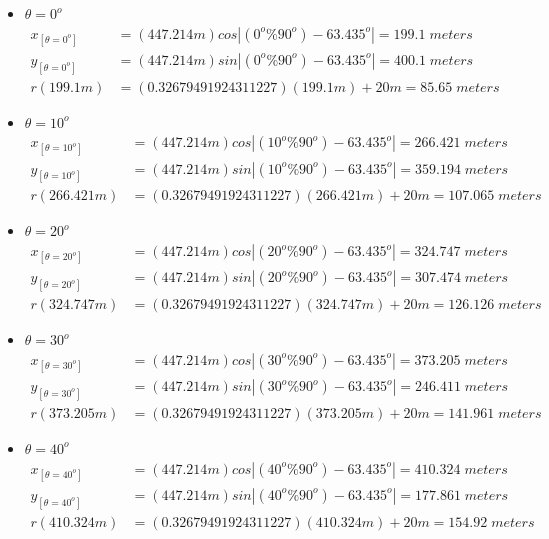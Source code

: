     \begin{itemize}
\item $\theta=0^o$
	\begin{align*}%
		x_{[\theta=0^o]} &=(447.214m) cos\left| (0^o\%90^o) - 63.435^o \right|  =199.1\;meters \\
		y_{[\theta=0^o]} &=(447.214m) sin\left| (0^o\%90^o) - 63.435^o \right|  =400.1\;meters \\
		r(199.1m) &=(0.32679491924311227)(199.1m)+20m  =85.65\;meters\end{align*}
\item $\theta=10^o$
	\begin{align*}%
		x_{[\theta=10^o]} &=(447.214m) cos\left| (10^o\%90^o) - 63.435^o \right|  =266.421\;meters \\
		y_{[\theta=10^o]} &=(447.214m) sin\left| (10^o\%90^o) - 63.435^o \right|  =359.194\;meters \\
		r(266.421m) &=(0.32679491924311227)(266.421m)+20m  =107.065\;meters\end{align*}
\item $\theta=20^o$
	\begin{align*}%
		x_{[\theta=20^o]} &=(447.214m) cos\left| (20^o\%90^o) - 63.435^o \right|  =324.747\;meters \\
		y_{[\theta=20^o]} &=(447.214m) sin\left| (20^o\%90^o) - 63.435^o \right|  =307.474\;meters \\
		r(324.747m) &=(0.32679491924311227)(324.747m)+20m  =126.126\;meters\end{align*}
\item $\theta=30^o$
	\begin{align*}%
		x_{[\theta=30^o]} &=(447.214m) cos\left| (30^o\%90^o) - 63.435^o \right|  =373.205\;meters \\
		y_{[\theta=30^o]} &=(447.214m) sin\left| (30^o\%90^o) - 63.435^o \right|  =246.411\;meters \\
		r(373.205m) &=(0.32679491924311227)(373.205m)+20m  =141.961\;meters\end{align*}
\item $\theta=40^o$
	\begin{align*}%
		x_{[\theta=40^o]} &=(447.214m) cos\left| (40^o\%90^o) - 63.435^o \right|  =410.324\;meters \\
		y_{[\theta=40^o]} &=(447.214m) sin\left| (40^o\%90^o) - 63.435^o \right|  =177.861\;meters \\
		r(410.324m) &=(0.32679491924311227)(410.324m)+20m  =154.92\;meters\end{align*}

\end{itemize}

